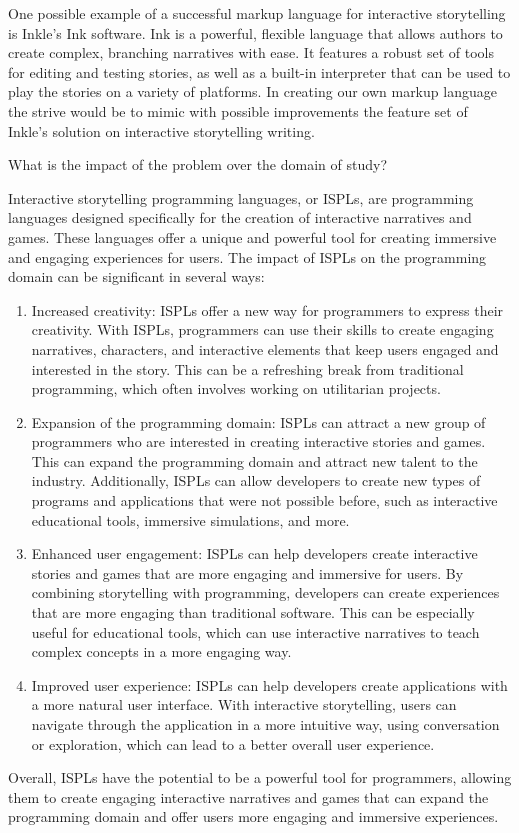 One possible example of a successful markup language for interactive storytelling is Inkle's Ink software. Ink is a powerful, flexible language that allows authors to create complex, branching narratives with ease. It features a robust set of tools for editing and testing stories, as well as a built-in interpreter that can be used to play the stories on a variety of platforms. In creating our own markup language the strive would be to mimic with possible improvements the feature set of Inkle’s solution on interactive storytelling writing.

 What is the impact of the problem over the domain of study?

 Interactive storytelling programming languages, or ISPLs, are programming languages designed specifically for the creation of interactive narratives and games. These languages offer a unique and powerful tool for creating immersive and engaging experiences for users. The impact of ISPLs on the programming domain can be significant in several ways:

 \begin{enumerate}
                 \item Increased creativity: ISPLs offer a new way for programmers to express their creativity. With ISPLs, programmers can use their skills to create engaging narratives, characters, and interactive elements that keep users engaged and interested in the story. This can be a refreshing break from traditional programming, which often involves working on utilitarian projects.
                 \item Expansion of the programming domain: ISPLs can attract a new group of programmers who are interested in creating interactive stories and games. This can expand the programming domain and attract new talent to the industry. Additionally, ISPLs can allow developers to create new types of programs and applications that were not possible before, such as interactive educational tools, immersive simulations, and more.
                 \item Enhanced user engagement: ISPLs can help developers create interactive stories and games that are more engaging and immersive for users. By combining storytelling with programming, developers can create experiences that are more engaging than traditional software. This can be especially useful for educational tools, which can use interactive narratives to teach complex concepts in a more engaging way.
                 \item Improved user experience: ISPLs can help developers create applications with a more natural user interface. With interactive storytelling, users can navigate through the application in a more intuitive way, using conversation or exploration, which can lead to a better overall user experience.
 \end{enumerate}
 Overall, ISPLs have the potential to be a powerful tool for programmers, allowing them to create engaging interactive narratives and games that can expand the programming domain and offer users more engaging and immersive experiences.


